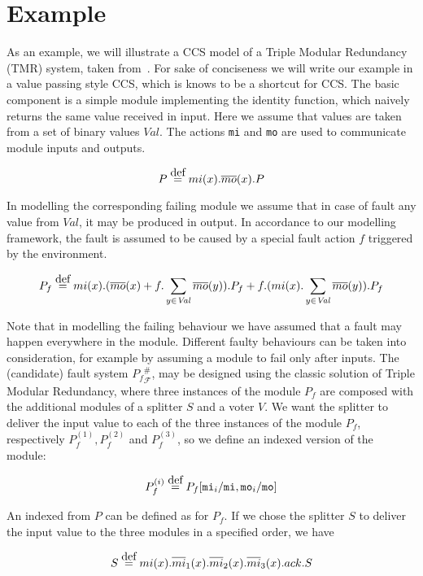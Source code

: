\documentclass{entcs}
\newcommand{\Faults}{\mathcal{F}}
\newcommand{\faulttolerant}[1]{{#1}^{\#}_\Faults}
\newcommand{\eqdef}{\stackrel{\mbox{{\tiny def}}}{=}}
\newcommand{\inp}[1]{{#1}}
\newcommand{\out}[1]{\overline{#1}}
\begin{document}
\section{Example}

As an example, we will illustrate a CCS model of a Triple Modular
Redundancy (TMR) system, taken from~\cite{B97}.  For sake of
conciseness we will write our example in a value passing style CCS,
which is knows to be a shortcut for CCS. The basic component is a
simple module implementing the identity function, which naively
returns the same value received in input.  Here we assume that values
are taken from a set of binary values $\mathit{Val}$.  The actions
{\tt mi} and {\tt mo} are used to communicate module inputs and
outputs.%

$$
P \eqdef \inp{mi}(x).\out{mo}(x).P
$$%

In modelling the corresponding failing module we assume that in case
of fault any value from $\mathit{Val}$, it may be produced in
output. In accordance to our modelling framework, the fault is assumed
to be caused by a special fault action $f$ triggered by the
environment.%

$$
P_f \eqdef
    \inp{mi}(x).(\out{mo}(x) +
    \inp{f}.\sum_{y \in \mathit{Val}}\out{mo}(y)).P_f +
    \inp{f}.(\inp{mi}(x).\sum_{y \in \mathit{Val}}\out{mo}(y)).P_f
$$%

Note that in modelling the failing behaviour we have assumed that a
fault may happen everywhere in the module. Different faulty behaviours
can be taken into consideration, for example by assuming a module to
fail only after inputs. The (candidate) fault system
$\faulttolerant{P_f}$, may be designed using the classic solution of
Triple Modular Redundancy, where three instances of the module $P_f$
are composed with the additional modules of a splitter $S$ and a voter
$V$. We want the splitter to deliver the input value to each of the
three instances of the module $P_f$, respectively $P^{(1)}_f,
P^{(2)}_f$ and $P^{(3)}_f$, so we define an indexed version of the
module: %

$$
P^{(i)}_f \eqdef P_f[{\tt mi}_i/{\tt mi}, {\tt mo}_i/{\tt mo}]
$$%

An indexed from $P$ can be defined as for $P_f$.  If we chose the
splitter $S$ to deliver the input value to the three modules in a
specified order, we have%

$$
S \eqdef \inp{mi}(x). \out{mi}_1(x).
                          \out{mi}_2(x).
                          \out{mi}_3(x).\inp{ack}.S
$$%
\end{document}
